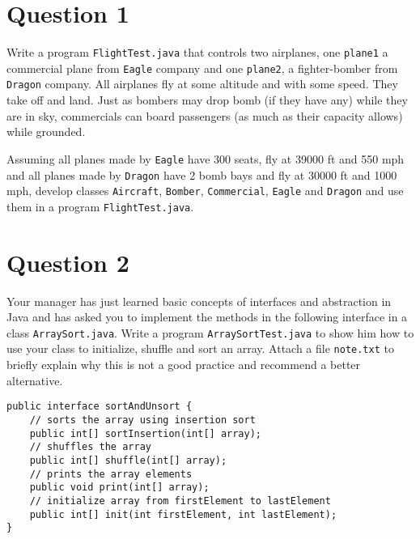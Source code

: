 \documentclass[12pt,letterpaper,twoside]{article}
\begin{document}


\section*{Question 1}

Write a program \texttt{FlightTest.java} that controls two airplanes, one \texttt{plane1} a commercial plane from \texttt{Eagle} company and one \texttt{plane2}, a fighter-bomber from \texttt{Dragon} company.  All airplanes fly at some altitude and with some speed. They take off and land. Just as bombers may drop bomb (if they have any) while they are in sky, commercials can board passengers (as much as their capacity allows) while grounded.

Assuming all planes made by \texttt{Eagle} have 300 seats, fly at 39000 ft and 550 mph and all planes made by \texttt{Dragon} have 2 bomb bays and fly at 30000 ft and 1000 mph, develop classes \texttt{Aircraft}, \texttt{Bomber}, \texttt{Commercial}, \texttt{Eagle} and \texttt{Dragon} and use them in a program \texttt{FlightTest.java}.

\section*{Question 2}

Your manager has just learned basic concepts of interfaces and abstraction in Java and has asked you to implement the methods in the following interface in a class \texttt{ArraySort.java}. Write a program \texttt{ArraySortTest.java} to show him how to use your class to initialize, shuffle and sort an array. Attach a file \texttt{note.txt} to briefly explain why this is not a good practice and recommend a better alternative.

\lstset{language=java}
\begin{lstlisting}
public interface sortAndUnsort {
	// sorts the array using insertion sort
	public int[] sortInsertion(int[] array);
	// shuffles the array
	public int[] shuffle(int[] array);
	// prints the array elements
	public void print(int[] array);
	// initialize array from firstElement to lastElement
	public int[] init(int firstElement, int lastElement);
}
\end{lstlisting}

\end{document}
